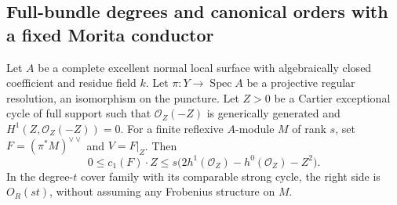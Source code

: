 \subsection{Full-bundle degrees and canonical orders with a fixed Morita conductor}

\begin{lemma}
\label{D:full-bundle-cycle-degree}
Let $A$ be a complete excellent normal local surface with
algebraically closed coefficient and residue field $k$.
Let $\pi:Y\to\operatorname{Spec}A$ be a projective regular
resolution, an isomorphism on the puncture. Let $Z>0$ be a
Cartier exceptional cycle of full support such that
$\mathcal O_Z(-Z)$ is generically generated and
$H^1(Z,\mathcal O_Z(-Z))=0$.
For a finite reflexive $A$-module $M$ of rank $s$, set
$F=(\pi^*M)^{\vee\vee}$ and $V=F|_Z$. Then
\[
 0\le c_1(F)\cdot Z
 \le s\bigl(2h^1(\mathcal O_Z)-h^0(\mathcal O_Z)-Z^2\bigr).
                                                        \tag{D.OC.1}
\]
In the degree-$t$ cover family with its comparable strong
cycle, the right side is $O_R(st)$, without assuming any
Frobenius structure on $M$.
\end{lemma}

